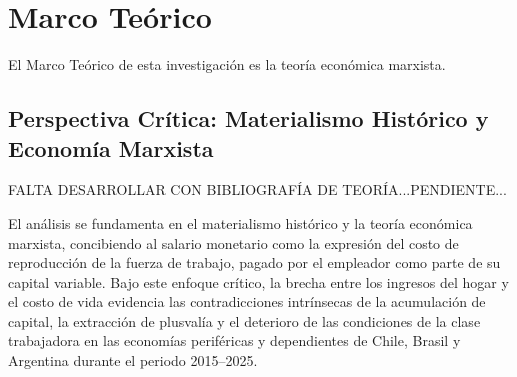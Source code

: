 \section{Marco Teórico}

El Marco Teórico de esta investigación es la teoría económica marxista.

\subsection{Perspectiva Crítica: Materialismo Histórico y Economía Marxista}
FALTA DESARROLLAR CON BIBLIOGRAFÍA DE TEORÍA...PENDIENTE...

El análisis se fundamenta en el materialismo histórico y la teoría económica marxista, concibiendo al salario monetario como la expresión del costo de reproducción de la fuerza de trabajo, pagado por el empleador como parte de su capital variable. Bajo este enfoque crítico, la brecha entre los ingresos del hogar y el costo de vida evidencia las contradicciones intrínsecas de la acumulación de capital, la extracción de plusvalía y el deterioro de las condiciones de la clase trabajadora en las economías periféricas y dependientes de Chile, Brasil y Argentina durante el periodo 2015--2025.
